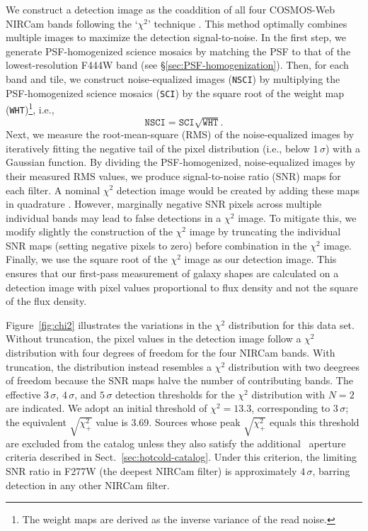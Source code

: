 \documentclass[longauth]{aa}
\begin{document}
We construct a detection image as the coaddition of all four COSMOS-Web NIRCam bands following the `$\chi^2$' technique \citep{szalay_simultaneous_1999,Drlica-Wagner2018}. This method optimally combines multiple images to maximize the detection signal-to-noise. In the first step, we generate PSF-homogenized science mosaics by matching the PSF to that of the lowest-resolution F444W band (see \S\ref{sec:PSF-homogenization}). Then, for each band and tile, we construct noise-equalized images (\texttt{NSCI}) by multiplying the PSF-homogenized science mosaics (\texttt{SCI}) by the square root of the weight map (\texttt{WHT})\footnote{The weight maps are derived as the inverse variance of the read noise.}, i.e., 
\begin{equation} 
    \texttt{NSCI} = \texttt{SCI} \sqrt{\texttt{WHT}}. 
\end{equation}
Next, we measure the root-mean-square (RMS) of the noise-equalized images by iteratively fitting the negative tail of the pixel distribution (i.e., below $1\,\sigma$) with a Gaussian function. By dividing the PSF-homogenized, noise-equalized images by their measured RMS values, we produce signal-to-noise ratio (SNR) maps for each filter. 
A nominal $\chi^2$ detection image would be created by adding these maps in quadrature \citep[e.g.,][]{szalay_simultaneous_1999}. 
However, marginally negative SNR pixels across multiple individual bands may lead to false detections in a $\chi^2$ image. 
To mitigate this, we modify slightly the construction of the $\chi^2$ image by truncating the individual SNR maps (setting negative pixels to zero) before combination in the $\chi^2$ image. 
Finally, we use the square root of the $\chi^2$ image as our detection image. This ensures that our first-pass measurement of galaxy shapes are calculated on a detection image with pixel values proportional to flux density and not the square of the flux density.  


Figure~\ref{fig:chi2} illustrates the variations in the  $\chi^2$ distribution for this data set.
Without truncation, the pixel values in the detection image follow a $\chi^2$ distribution with four degrees of freedom for the four NIRCam bands. With truncation, the distribution instead resembles a $\chi^2$ distribution with two deegrees of freedom because the SNR maps halve the number of contributing bands. The effective $3\,\sigma$, $4\,\sigma$, and $5\,\sigma$ detection thresholds for the $\chi^2$ distribution with $N=2$ are indicated. We adopt an initial threshold of $\chi^2 = 13.3$, corresponding to $3\,\sigma$; the equivalent $\sqrt{\chi^2_{+}}$ value is 3.69. Sources whose peak $\sqrt{\chi^2_{+}}$ equals this threshold are excluded from the catalog unless they also satisfy the additional \hotcold\ aperture criteria described in Sect.~\ref{sec:hotcold-catalog}. Under this criterion, the limiting SNR  ratio in F277W (the deepest NIRCam filter) is approximately $4\,\sigma$, barring detection in any other NIRCam filter. 
\end{document}

